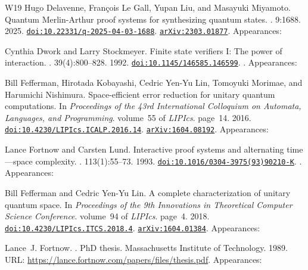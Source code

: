 \documentclass[10pt,a4paper]{article}
\numberwithin{equation}{section}
\numberwithin{figure}{section}
\begin{document}
\begin{thebibliography}{{}W19}
Hugo Delavenne, Fran{\c{c}}ois {Le Gall}, Yupan Liu, and Masayuki Miyamoto.
\newblock Quantum {M}erlin-{A}rthur proof systems for synthesizing quantum states.
. 9:1688. 2025.
\newblock \href {https://doi.org/10.22331/q-2025-04-03-1688} {\texttt{doi:10.22331/q-2025-04-03-1688}}. \href {https://arxiv.org/abs/2303.01877} {\texttt{arXiv:2303.01877}}. Appearances:\!

Cynthia Dwork and Larry Stockmeyer.
\newblock Finite state verifiers {I}: The power of interaction.
. 39(4):800--828. 1992.
\newblock \href {https://doi.org/10.1145/146585.146599} {\texttt{doi:10.1145/146585.146599}}. . Appearances:\!

Bill Fefferman, Hirotada Kobayashi, Cedric Yen-Yu Lin, Tomoyuki Morimae, and Harumichi Nishimura.
\newblock Space-efficient error reduction for unitary quantum computations.
\newblock In {\em Proceedings of the 43rd International Colloquium on Automata, Languages, and Programming}. volume~55 of {\em LIPIcs}. page~14. 2016.
\newblock \href {https://doi.org/10.4230/LIPIcs.ICALP.2016.14} {\texttt{doi:10.4230/LIPIcs.ICALP.2016.14}}. \href {https://arxiv.org/abs/1604.08192} {\texttt{arXiv:1604.08192}}. Appearances:\!

Lance Fortnow and Carsten Lund.
\newblock Interactive proof systems and alternating time—space complexity.
. 113(1):55--73. 1993.
\newblock \href {https://doi.org/10.1016/0304-3975(93)90210-K} {\texttt{doi:10.1016/0304-3975(93)90210-K}}. . Appearances:\!

Bill Fefferman and Cedric Yen-Yu Lin.
\newblock A complete characterization of unitary quantum space.
\newblock In {\em Proceedings of the 9th Innovations in Theoretical Computer Science Conference}. volume~94 of {\em LIPIcs}. page~4. 2018.
\newblock \href {https://doi.org/10.4230/LIPIcs.ITCS.2018.4} {\texttt{doi:10.4230/LIPIcs.ITCS.2018.4}}. \href {https://arxiv.org/abs/1604.01384} {\texttt{arXiv:1604.01384}}. Appearances:\!

Lance~J. Fortnow.
.
\newblock PhD thesis. Massachusetts Institute of Technology. 1989.
\newblock URL: \url{https://lance.fortnow.com/papers/files/thesis.pdf}. Appearances:\!


\end{thebibliography}
\end{document}
